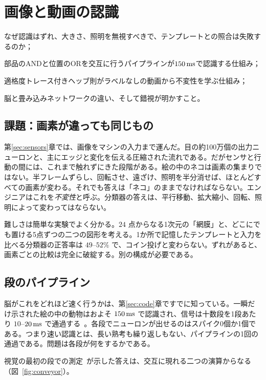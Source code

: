 \chapter{画像と動画の認識}
\label{sec:recognition}
\begin{chaptergoals}
\item なぜ認識はずれ、大きさ、照明を無視すべきで、テンプレートとの照合は失敗するのか；
\item 部品のANDと位置のORを交互に行うパイプラインが$150\,\text{ms}$で認識する仕組み；
\item 適格度トレース付きヘッブ則がラベルなしの動画から不変性を学ぶ仕組み；
\item 脳と畳み込みネットワークの違い、そして錯視が明かすこと。
\end{chaptergoals}

\section{課題：画素が違っても同じもの}

第\ref{sec:sensors}章では、画像をマシンの入力まで運んだ。目の約100万個の出力ニューロンと、主にエッジと変化を伝える圧縮された流れである。だがセンサと行動の間には、これまで触れずにきた段階がある。絵の中のネコは画素の集まりではない。半フレームずらし、回転させ、遠ざけ、照明を半分消せば、ほとんどすべての画素が変わる。それでも答えは「ネコ」のままでなければならない。エンジニアはこれを\emph{不変性}と呼ぶ。分類器の答えは、平行移動、拡大縮小、回転、照明によって変わってはならない。

難しさは簡単な実験でよく分かる。$24$ 点からなる1次元の「網膜」と、どこにでも置ける5点ずつの二つの図形を考える。1か所で記憶したテンプレートと入力を比べる分類器の正答率は $49$--$52\%$ で、コイン投げと変わらない。ずれがあると、画素ごとの比較は完全に破綻する。別の構成が必要である。

\section{段のパイプライン}

脳がこれをどれほど速く行うかは、第\ref{sec:code}章ですでに知っている。一瞬だけ示された絵の中の動物はおよそ $150\,\text{ms}$ で認識され、信号は十数段を1段あたり $10$--$20\,\text{ms}$ で通過する~\cite{Thorpe1996}。各段でニューロンが出せるのはスパイク0個か1個である。つまり速い認識とは、長い熟考も繰り返しもない、パイプラインの1回の通過である。問題は各段が何をするかである。

視覚の最初の段での測定~\cite{HubelWiesel1962}が示した答えは、交互に現れる二つの演算からなる（図~\ref{fig:conveyor}）。

